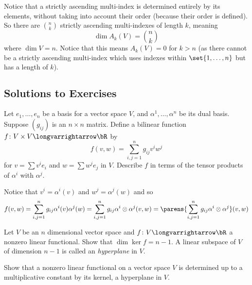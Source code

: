 \documentclass[10pt]{article}
\let\longto=\longvarrightarrow
\begin{document}
Notice that a strictly ascending multi-index is determined entirely by its elements, without taking into account their order (because their order is defined).
So there are $\binom nk$ strictly ascending multi-indexes of length $k$, meaning
\[ \dim A_k(V) = \binom nk \]
where $\dim V=n$.
Notice that this means $A_k(V)=0$ for $k>n$ (as there cannot be a strictly ascending multi-index which uses indexes within $\set{1,\dots,n}$ but has a length of $k$).

\subsection{Solutions to Exercises}

\begin{exercise*}

    Let $e_1,\dots,e_n$ be a basis for a vector space $V$, and $\alpha^1,\dots,\alpha^n$ be its dual basis.
    Suppose $(g_{ij})$ is an $n\times n$ matrix.
    Define a bilinear function $f\colon V\times V\longto\bR$ by
    \[ f(v,w) = \sum_{i,j=1}^n g_{ij}v^iw^j \]
    for $v=\sum v^ie_i$ and $w=\sum w^je_j$ in $V$.
    Describe $f$ in terms of the tensor products of $\alpha^i$ with $\alpha^j$.

\end{exercise*}

Notice that $v^i=\alpha^i(v)$ and $w^j=\alpha^j(w)$ and so
\[ f(v,w) = \sum_{i,j=1}^n g_{ij}\alpha^i(v)\alpha^j(w) = \sum_{i,j=1}^n g_{ij}\alpha^i\otimes\alpha^j(v,w) = \parens{\sum_{i,j=1}^n g_{ij}\alpha^i\otimes\alpha^j}(v,w) \]

\begin{exercise*}

    \benum
        \item Let $V$ be an $n$ dimensional vector space and $f\colon V\longto\bR$ a nonzero linear functional.
            Show that $\dim\ker f=n-1$.
            A linear subspace of $V$ of dimension $n-1$ is called an \emph{hyperplane} in $V$.
        \item Show that a nonzero linear functional on a vector space $V$ is determined up to a multiplicative constant by its kernel, a hyperplane in $V$.
    \eenum

\end{exercise*}
\end{document}
